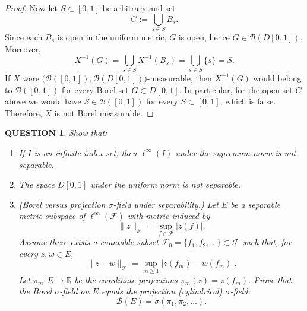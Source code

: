 \documentclass[12pt]{article}
\renewcommand{\(}{\left(}%
\renewcommand{\)}{\right)}%
\renewcommand{\[}{\left[}%
\renewcommand{\]}{\right]}%
\newtheorem{question}{QUESTION}[section]}
\newtheorem{proof}{Proof.}}
\begin{document}
\begin{proof}
Now let $S\subset[0,1]$ be arbitrary and set
\begin{equation*}
G:=\bigcup_{s\in S} B_s.
\end{equation*}
Since each $B_s$ is open in the uniform metric, $G$ is open, hence $G\in\mathcal B(D[0,1])$.
Moreover,
\begin{equation*}
X^{-1}(G)
=
\bigcup_{s\in S}X^{-1}(B_s)
=
\bigcup_{s\in S}\{s\}
=
S.
\end{equation*}
If $X$ were $\big(\mathcal B([0,1]),\mathcal B(D[0,1])\big)$-measurable, then $X^{-1}(G)$ would
belong to $\mathcal B([0,1])$ for every Borel set $G\subset D[0,1]$. In particular, for the
open set $G$ above we would have $S\in\mathcal B([0,1])$ for every $S\subset[0,1]$, which is
false. Therefore, $X$ is not Borel measurable.
\end{proof}

\begin{question}
Show that:

\begin{enumerate}
\item[(i)] If $I$ is an infinite index set, then $\ell^\infty(I)$ under the supremum norm is not separable.

\item[(ii)] The space $D[0,1]$ under the uniform norm is not separable.

\item[(iii)] (\emph{Borel versus projection $\sigma$-field under separability.})
Let $E$ be a \emph{separable} metric subspace of $\ell^\infty(\mathcal F)$ with metric induced by
\begin{equation*}
\|z\|_{\mathcal F}=\sup_{f\in\mathcal F}|z(f)|.
\end{equation*}
Assume there exists a \emph{countable} subset $\mathcal F_0=\{f_1,f_2,\dots\}\subset\mathcal F$
such that, for every $z,w\in E$,
\begin{equation*}
\|z-w\|_{\mathcal F}=\sup_{m\ge 1}|z(f_m)-w(f_m)|.
\end{equation*}
Let $\pi_m:E\to\mathbb R$ be the coordinate projections $\pi_m(z)=z(f_m)$.
Prove that the Borel $\sigma$-field on $E$ equals the projection (cylindrical) $\sigma$-field:
\begin{equation*}
\mathcal B(E)=\sigma(\pi_1,\pi_2,\dots).
\end{equation*}
\end{enumerate}
\end{question}
\end{document}
